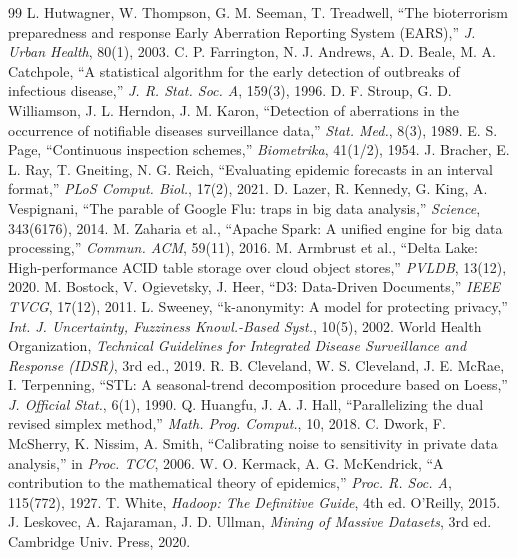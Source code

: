 \documentclass[conference]{IEEEtran}
\begin{document}

\begin{thebibliography}{99}
 L. Hutwagner, W. Thompson, G. M. Seeman, T. Treadwell, ``The bioterrorism preparedness and response Early Aberration Reporting System (EARS),'' \emph{J. Urban Health}, 80(1), 2003.
 C. P. Farrington, N. J. Andrews, A. D. Beale, M. A. Catchpole, ``A statistical algorithm for the early detection of outbreaks of infectious disease,'' \emph{J. R. Stat. Soc. A}, 159(3), 1996.
 D. F. Stroup, G. D. Williamson, J. L. Herndon, J. M. Karon, ``Detection of aberrations in the occurrence of notifiable diseases surveillance data,'' \emph{Stat. Med.}, 8(3), 1989.
 E. S. Page, ``Continuous inspection schemes,'' \emph{Biometrika}, 41(1/2), 1954.
 J. Bracher, E. L. Ray, T. Gneiting, N. G. Reich, ``Evaluating epidemic forecasts in an interval format,'' \emph{PLoS Comput. Biol.}, 17(2), 2021.
 D. Lazer, R. Kennedy, G. King, A. Vespignani, ``The parable of Google Flu: traps in big data analysis,'' \emph{Science}, 343(6176), 2014.
 M. Zaharia et al., ``Apache Spark: A unified engine for big data processing,'' \emph{Commun. ACM}, 59(11), 2016.
 M. Armbrust et al., ``Delta Lake: High-performance ACID table storage over cloud object stores,'' \emph{PVLDB}, 13(12), 2020.
 M. Bostock, V. Ogievetsky, J. Heer, ``D3: Data-Driven Documents,'' \emph{IEEE TVCG}, 17(12), 2011.
 L. Sweeney, ``k-anonymity: A model for protecting privacy,'' \emph{Int. J. Uncertainty, Fuzziness Knowl.-Based Syst.}, 10(5), 2002.
 World Health Organization, \emph{Technical Guidelines for Integrated Disease Surveillance and Response (IDSR)}, 3rd ed., 2019.
 R. B. Cleveland, W. S. Cleveland, J. E. McRae, I. Terpenning, ``STL: A seasonal-trend decomposition procedure based on Loess,'' \emph{J. Official Stat.}, 6(1), 1990.
 Q. Huangfu, J. A. J. Hall, ``Parallelizing the dual revised simplex method,'' \emph{Math. Prog. Comput.}, 10, 2018.
 C. Dwork, F. McSherry, K. Nissim, A. Smith, ``Calibrating noise to sensitivity in private data analysis,'' in \emph{Proc. TCC}, 2006.
 W. O. Kermack, A. G. McKendrick, ``A contribution to the mathematical theory of epidemics,'' \emph{Proc. R. Soc. A}, 115(772), 1927.
 T. White, \emph{Hadoop: The Definitive Guide}, 4th ed. O'Reilly, 2015.
 J. Leskovec, A. Rajaraman, J. D. Ullman, \emph{Mining of Massive Datasets}, 3rd ed. Cambridge Univ. Press, 2020.

\end{thebibliography}
\end{document}
